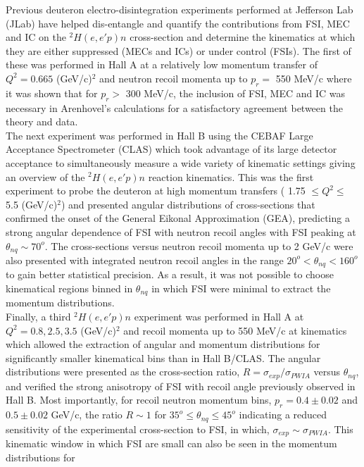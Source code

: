 \indent Previous deuteron electro-disintegration experiments performed at Jefferson Lab (JLab) have helped dis-entangle and quantify the contributions from FSI, MEC and IC on
the $^{2}H(e,e'p)n$ cross-section and determine the kinematics at which they are either suppressed (MECs and ICs) or under control (FSIs). The first of these was performed in Hall A  \cite{PhysRevLett.89.062301} at a relatively low momentum transfer of $Q^{2}=0.665$ (GeV/c)$^{2}$ and neutron recoil momenta
up to $p_{r} = $ 550 MeV/c where it was shown that for $p_{r}>$ 300 MeV/c, the inclusion of FSI, MEC and IC was necessary in Arenhovel's calculations for a satisfactory
agreement between the theory and data. \\
\indent The next experiment was performed in Hall B \cite{PhysRevLett.98.262502} using the CEBAF Large Acceptance Spectrometer (CLAS) which took advantage of its large detector acceptance to
simultaneously measure a wide variety of kinematic settings giving an overview of the $^{2}H(e,e'p)n$ reaction kinematics. This was the first experiment to probe
the deuteron at high momentum transfers ( 1.75 $\leq Q^{2}\leq$ 5.5 (GeV/c)$^{2}$) and presented angular distributions of cross-sections that confirmed the onset of
the General Eikonal Approximation (GEA), predicting a strong angular dependence of FSI with neutron recoil angles with FSI peaking at $\theta_{nq} \sim 70^{o}$.
The cross-sections versus neutron recoil momenta up to 2 GeV/c were also presented with integrated neutron recoil angles in the range $20^{o}< \theta_{nq}<160^{o}$
to gain better statistical precision. As a result, it was not possible to choose kinematical regions binned in $\theta_{nq}$ in which FSI were minimal to extract the momentum distributions. \\
\indent Finally, a third $^{2}H(e,e'p)n$ experiment was performed in Hall A \cite{PhysRevLett.107.262501} at $Q^{2} = 0.8, 2.5, 3.5$ (GeV/c)$^{2}$ and recoil momenta up to 550 MeV/c at kinematics
which allowed the extraction of angular and momentum distributions for significantly smaller kinematical bins than in Hall B/CLAS. The angular distributions were presented
as the cross-section ratio, $R = \sigma_{exp}/\sigma_{PWIA}$ versus $\theta_{nq}$, and verified the strong anisotropy of FSI with recoil angle previously observed in Hall B. Most importantly, for recoil
neutron momentum bins, $p_{r}=0.4\pm0.02$ and $0.5\pm0.02$ GeV/c, the ratio $R\sim1$ for $35^{o}\leq \theta_{nq}\leq45^{o}$ indicating a reduced sensitivity of the experimental
cross-section to FSI, in which, $\sigma_{exp}\sim\sigma_{PWIA}$.  This kinematic window in which FSI are small can also be seen in the momentum distributions for
